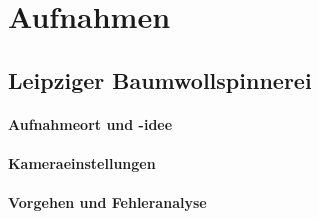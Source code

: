 \documentclass[liststotoc,bibtotoc,fontsize=14pt,]{scrreprt}
\begin{document}
		
	\chapter{Aufnahmen}
	\label{ch:aufnahmen}
	
	\section{Leipziger Baumwollspinnerei}
	\label{sec:spinnerei}

	\subsubsection{Aufnahmeort und -idee}
			
	
		\subsubsection{Kameraeinstellungen}
		
		
	\subsubsection{Vorgehen und Fehleranalyse}
	
\end{document}

